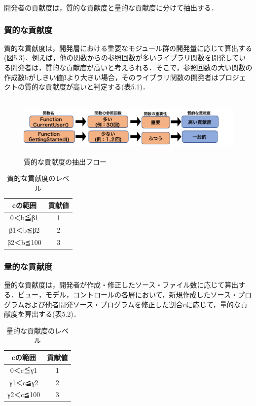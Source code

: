 \documentclass{funthesis}
\begin{document}
開発者の貢献度は，質的な貢献度と量的な貢献度に分けて抽出する．
\subsubsection{質的な貢献度}
質的な貢献度は，開発層における重要なモジュール群の開発量に応じて算出する(図5.3)．例えば，他の関数からの参照回数が多いライブラリ関数を開発している開発者は，質的な貢献度が高いと考えられる．そこで，参照回数の大い関数の作成数bがしきい値βより大きい場合，そのライブラリ関数の開発者はプロジェクトの質的な貢献度が高いと判定する(表5.1)．
\begin{figure}[!t]
\centering  %
\includegraphics[clip,width=16cm,height=3cm]{figures/contribution_quality.pdf}
  \caption{質的な貢献度の抽出フロー}    \label{sample}
\end{figure}

\begin{table}[htb]
  \begin{center}
    \begin{tabular}{|c||c|} \hline
      cの範囲 & 貢献値  \\ \hline
      0＜b≦β1 & 1 \\ \hline
      β1＜b≦β2 & 2 \\ \hline
      β2＜b≦100 & 3  \\ \hline
    \end{tabular}
  \end{center}
  \caption{質的な貢献度のレベル}    \label{sample}
\end{table}

\subsubsection{量的な貢献度}
量的な貢献度は，開発者が作成・修正したソース・ファイル数に応じて算出する．ビュー，モデル，コントロールの各層において，新規作成したソース・プログラムおよび他者開発ソース・プログラムを修正した割合cに応じて，量的な貢献度を算出する(表5.2)．
\begin{table}[htb]
  \begin{center}
    \begin{tabular}{|c||c|} \hline
      cの範囲 & 貢献値  \\ \hline
      0＜c≦γ1 & 1 \\ \hline
      γ1＜c≦γ2 & 2 \\ \hline
      γ2＜c≦100 & 3  \\ \hline
    \end{tabular}
  \end{center}
  \caption{量的な貢献度のレベル}    \label{sample}
\end{table}
\end{document}
